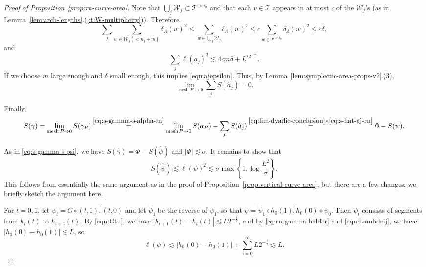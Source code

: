 \documentclass[10pt,a4paper]{amsart}
\newcommand{\cT}{\mathcal{T}}
\newcommand{\cW}{\mathcal{W}}
\DeclareMathOperator{\mesh}{mesh}
\begin{document}
\begin{proof}[Proof of Proposition~\ref{prop:rn-curve-area}]
  Note that $\bigcup_j \cW_j \subset \cT^{>i_0}$ and that each $v\in \cT$ appears in at most $c$ of the $\cW_j$'s (as in Lemma~\ref{lem:arch-lengths}.(\ref{it:W-multiplicity})). Therefore, 
  $$
  \sum_j \sum_{w\in \cW_j(<n_j + m)}\delta_\Lambda(w)^2 \le \sum_{w\in \bigcup_j \cW_j}\delta_\Lambda(w)^2 \le c \sum_{w\in \cT^{>i_0}}\delta_\Lambda(w)^2 \le c\delta,
  $$
  and
  $$\sum_j \ell(a_j)^2\lesssim 4cm\delta + L^22^{-m}.$$
  If we choose $m$ large enough and $\delta$ small enough, this implies \eqref{eqn:ajepsilon}. Thus, by Lemma~\ref{lem:symplectic-area-props-v2}.(3), 
  \begin{equation}\label{eq:s-hat-aj-rn}
    \lim_{\mesh P \to 0}\sum_j S(\hat{a}_j) = 0.
  \end{equation}

  Finally,
  \begin{equation}\label{eq:sgamma-rn}
    S(\gamma) = \lim_{\mesh P \to 0} S(\gamma_P) \stackrel{\eqref{eq:s-gamma-s-alpha-rn}}{=} \lim_{\mesh P \to 0} S(\alpha_P) - \sum_j S(\hat{a}_j)  \stackrel{\eqref{eq:lim-dyadic-conclusion} \wedge \eqref{eq:s-hat-aj-rn}}{=} \Phi - S(\psi).
  \end{equation}

  As in \eqref{eq:s-gamma-s-psi}, we have $S(\hat\gamma)=\Phi-S(\hat\psi)$ and $|\Phi|\lesssim\sigma$. It remains to show that 
  \begin{equation}\label{eq:rn-target}
    S(\hat{\psi}) \lesssim \ell(\psi)^2 \lesssim \sigma\max\left\{1,\log\frac{L^2}{\sigma}\right\}.
  \end{equation}
  This follows from essentially the same argument as in the proof of Proposition~\ref{prop:vertical-curve-area}, but there are a few changes; we briefly sketch the argument here.

  For $t=0,1$, let $\psi_t = G\circ \overline{(t,1),(t,0)}$ and let $\tilde{\psi}_1$ be the reverse of $\psi_1$, so that $\psi = \tilde{\psi}_1 \diamond \overline{h_0(1), h_0(0)}\diamond \psi_0$. 
  Then $\psi_t$ consists of segments from $h_i(t)$ to $h_{i+1}(t)$. By \eqref{eqn:Gtu}, we have $|h_{i+1}(t)-h_i(t)|\lesssim L2^{-\frac{i}{2}}$, and by \eqref{eq:rn-gamma-holder} and \eqref{eqn:Lambdaij}, we have $|h_0(0)-h_0(1)| \lesssim L$, so
  \begin{equation}\label{eq:ell-psi-rn}
    \ell(\psi) \lesssim |h_0(0)-h_0(1)| + \sum_{i=0}^\infty L2^{-\frac{i}{2}} \lesssim L.
  \end{equation}


\end{proof}
\end{document}
